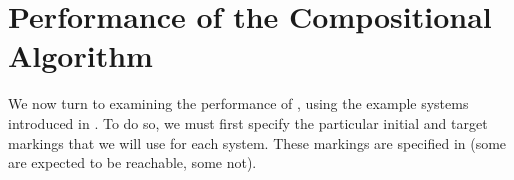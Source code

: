 \section{Performance of the Compositional Algorithm}\label{sec:performance}

\newcommand{\exampleRef}[5][0]{%
\item[] {%
\begin{tabular}{r l}%
    \emph{system}:& {\bf #2} (\secref{sec:example-#3})\\
    \emph{initial}:& \parbox[t]{0.75\linewidth}{#4} \\
    \emph{target} $(\mathlarger{\mathlarger{\ifthenelse{#1=1}{\yesReachable}{\noReachable}}})$:& \parbox[t]{0.75\linewidth}{#5} \\
\end{tabular}}}

We now turn to examining the performance of , using
the example systems introduced in .  To do so, we must
first specify the particular initial and target markings that we will use for
each system. These markings are specified in  (some
are expected to be reachable, some not).


